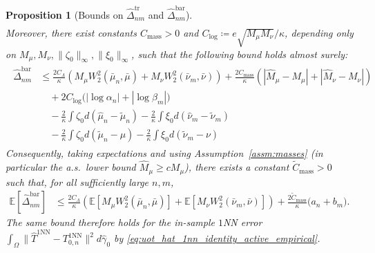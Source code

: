 \documentclass[10pt,a4paper]{amsart}
\newtheorem{proposition}{Proposition}
\newcommand{\Ep}{\mathbb{E}}
\renewcommand{\hat}{\widehat}
\renewcommand{\tilde}{\widetilde}
\begin{document}
\begin{proposition}[Bounds on $\hat\Delta_{nm}^{\mathrm{tr}}$ and $\hat\Delta_{nm}^{\mathrm{bar}}$]
\begin{align}
\end{align}
Moreover, there exist constants $C_{\mathrm{mass}}>0$ and
$C_{\mathrm{log}}\coloneqq e\sqrt{M_\mu M_\nu}/\kappa$, depending only on
$M_\mu,M_\nu,\|\zeta_0\|_\infty,\|\xi_0\|_\infty$, such that the following bound holds almost surely:
\begin{align}
\label{eq:uot_hat_barycentric_rate_bound}
\begin{aligned}
    \hat\Delta_{nm}^{\mathrm{bar}}
    &\le
    \frac{2C_\Lambda}{\kappa}
    \left(
        M_\mu W_2^2(\bar\mu_n,\bar\mu)+M_\nu W_2^2(\bar\nu_m,\bar\nu)
    \right)
    + \frac{2C_{\mathrm{mass}}}{\kappa}
    \left(
        |\hat M_\mu-M_\mu|+|\hat M_\nu-M_\nu|
    \right) \\
    &\quad+ 2C_{\mathrm{log}}\bigl(|\log\alpha_n|+|\log\beta_m|\bigr) \\
    &\quad - \frac{2}{\kappa} \int\zeta_0 d(\hat\mu_n-\tilde\mu_n)
            - \frac{2}{\kappa} \int\xi_0 d(\hat\nu_m-\tilde\nu_m) \\
    &\quad - \frac{2}{\kappa} \int\zeta_0 d(\tilde\mu_n-\mu)
            - \frac{2}{\kappa} \int\xi_0 d(\tilde\nu_m-\nu)
\end{aligned}
\end{align}
Consequently, taking expectations and using
Assumption~\ref{assm:masses} (in particular the a.s.\ lower bound $\hat M_\mu\ge cM_\mu$), there exists a
constant $\widetilde C_{\mathrm{mass}}>0$ such that, for all sufficiently large $n,m$,
\begin{align}
\label{eq:uot_hat_barycentric_expectation_bound}
    \Ep[\hat\Delta_{nm}^{\mathrm{bar}}]
    &\le
    \frac{2C_\Lambda}{\kappa}
    \left(
        \Ep[M_\mu W_2^2(\bar\mu_n,\bar\mu)] + \Ep[M_\nu W_2^2(\bar\nu_m,\bar\nu)]
    \right)
    + \frac{2\widetilde C_{\mathrm{mass}}}{\kappa}\bigl(a_n+b_m\bigr).
\end{align}
The same bound therefore holds for the in-sample $1$NN error
\(
\int_\Omega \|\hat T^{\mathrm{1NN}}-T_{0,n}^{\mathrm{1NN}}\|^2 d\hat\gamma_0
\)
by \eqref{eq:uot_hat_1nn_identity_active_empirical}.
\end{proposition}
\end{document}
